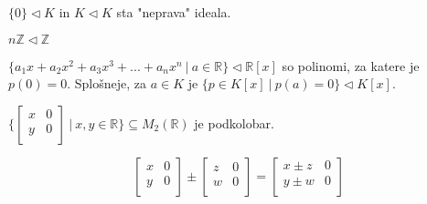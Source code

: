 \documentclass[11pt, a4paper]{article}
\begin{document}
    \begin{example}
        \(\{0\} \triangleleft K\) in \(K \triangleleft K\) sta "neprava" ideala.
    \end{example}

    \begin{example}
        \(n \mathbb{Z} \triangleleft \mathbb{Z}\)
    \end{example}

    \begin{example}
        \(\{a_1 x + a_2 x^2 + a_3 x^3 + ... + a_n x^n\ |\ a \in \mathbb{R}\} \triangleleft \mathbb{R}[x]\) so polinomi, za katere je \(p(0) = 0\). Splošneje, za \(a \in K\) je \(\{p \in K[x]\ |\ p(a) = 0\} \triangleleft K[x]\).
    \end{example}

    \begin{example}
        \(\{
            \begin{bmatrix}
                x & 0 \\
                y & 0 \\
            \end{bmatrix}\
            |\ x,y \in \mathbb{R}
        \} \subseteq M_2(\mathbb{R})\) je podkolobar.

        \[
            \begin{bmatrix}
                x & 0 \\
                y & 0 \\
            \end{bmatrix}
            \pm
            \begin{bmatrix}
                z & 0 \\
                w & 0 \\
            \end{bmatrix}
            =
            \begin{bmatrix}
                x \pm z & 0 \\
                y \pm w & 0 \\
            \end{bmatrix}
        \]


\end{example}
\end{document}
